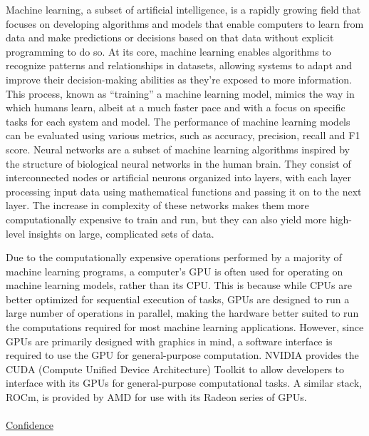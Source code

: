 \documentclass[titlepage,draft]{article}
\begin{document}
Machine learning, a subset of artificial intelligence, is a rapidly growing field that focuses on developing algorithms and
models that enable computers to learn from data and make predictions or decisions based on that data without explicit programming
to do so.
At its core, machine learning enables algorithms to recognize patterns and relationships in datasets, allowing systems to adapt
and improve their decision-making abilities as they're exposed to more information.
This process, known as ``training'' a machine learning model, mimics the way in which humans learn, albeit at a much faster pace
and with a focus on specific tasks for each system and model.
The performance of machine learning models can be evaluated using various metrics, such as accuracy, precision, recall and F1
score.
Neural networks are a subset of machine learning algorithms inspired by the structure of biological neural networks in the human
brain.
They consist of interconnected nodes or artificial neurons organized into layers, with each layer processing input data using
mathematical functions and passing it on to the next layer.
The increase in complexity of these networks makes them more computationally expensive to train and run, but they can also yield
more high-level insights on large, complicated sets of data.

Due to the computationally expensive operations performed by a majority of machine learning programs, a computer's GPU is often
used for operating on machine learning models, rather than its CPU.
This is because while CPUs are better optimized for sequential execution of tasks, GPUs are designed to run a large number of
operations in parallel, making the hardware better suited to run the computations required for most machine learning applications.
However, since GPUs are primarily designed with graphics in mind, a software interface is required to use the GPU for
general-purpose computation.
NVIDIA provides the CUDA (Compute Unified Device Architecture) Toolkit \cite{CUDA} to allow developers to interface with its
GPUs for general-purpose computational tasks.
A similar stack, ROCm, is provided by AMD for use with its Radeon series of GPUs. \cite{ROCm}
\\~\\
\underline{Confidence}
\end{document}
